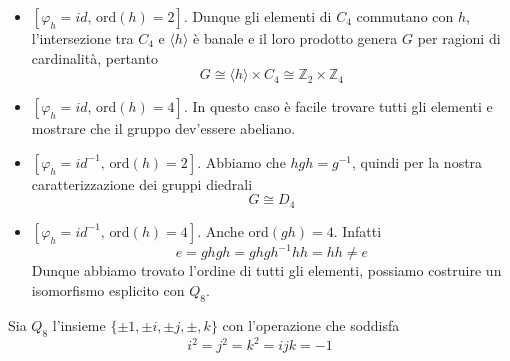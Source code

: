 \begin{multicols}{2}
\begin{itemize}
	\item $ \left[\varphi_h =  id, \, \text{ord}(h) =2\right] $. Dunque gli elementi di $ C_4 $ commutano con $ h $, l'intersezione tra $ C_4 $ e $ \langle h \rangle $ è banale e il loro prodotto genera $ G $ per ragioni di cardinalità, pertanto \[ G \cong  \langle h \rangle\times C_4  \cong  \mathbb{Z}_2\times\mathbb{Z}_4 \]
	\item $ \left[\varphi_h =  id, \, \text{ord}(h) =4\right] $. In questo caso è facile trovare tutti gli elementi e mostrare che il gruppo dev'essere abeliano.
	\item $ \left[\varphi_h =  id^{-1}, \, \text{ord}(h) =2\right] $. Abbiamo che $ hgh = g^{-1} $, quindi per la nostra caratterizzazione dei gruppi diedrali \[ G \cong D_4 \]
	\item $ \left[\varphi_h =  id^{-1}, \, \text{ord}(h) =4\right] $. Anche ord$ (gh) = 4 $. Infatti
	\[ e = ghgh = ghgh^{-1}hh = hh \neq e \]
	Dunque abbiamo trovato l'ordine di tutti gli elementi, possiamo costruire un isomorfismo esplicito con $ Q_8 $.
\end{itemize}
\begin{definition}[Quaternioni]
	Sia $ Q_8 $ l'insieme $ \{ \pm 1, \pm i, \pm j, \pm, k \} $ con l'operazione che soddisfa
	\[ i^2 = j^2 = k^2 = ijk = -1 \]
\end{definition}
\end{multicols}



